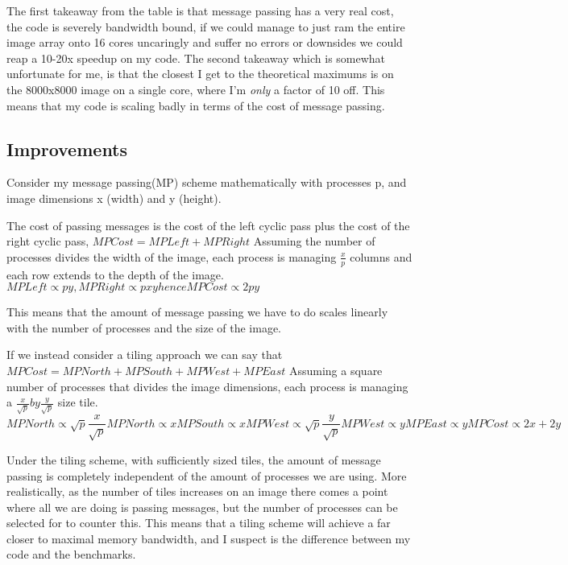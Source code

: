 \documentclass[10pt]{article}
\begin{document}
    The first takeaway from the table is that message passing has a very real cost, the code is severely bandwidth bound,
    if we could manage to just ram the entire image array onto 16 cores uncaringly and suffer no errors or downsides we could reap a 10-20x speedup on my code.
    The second takeaway which is somewhat unfortunate for me, is that the closest I get to the theoretical maximums is on the 8000x8000 image on a single core, where
    I'm \textit{only} a factor of 10 off. This means that my code is scaling badly in terms of the cost of message passing.

    \subsection{Improvements}
    Consider my message passing(MP) scheme mathematically with processes p, and image dimensions x (width) and y (height).

    The cost of passing messages is the cost of the left cyclic pass plus the cost of the right cyclic pass, $MP Cost = MP Left + MP Right$
    Assuming the number of processes divides the width of the image, each process is managing $\frac{x}{p}$ columns and each row extends to
    the depth of the image.
    $MP Left \propto py , MP Right \propto pxy hence MP Cost \propto 2py$

    This means that the amount of message passing we have to do scales linearly with the number of processes and the size of the image.

    If we instead consider a tiling approach we can say that $MP Cost = MP North + MP South + MP West + MP East$
    Assuming a square number of processes that divides the image dimensions, each process is managing a $\frac{x}{\sqrt{p}} by \frac{y}{\sqrt{p}}$ size tile.
    $$ MP North \propto \sqrt{p}\frac{x}{\sqrt{p}}
    MP North \propto x
    MP South \propto x
    MP West \propto \sqrt{p}\frac{y}{\sqrt{p}}
    MP West \propto y
    MP East \propto y

    MP Cost \propto 2x+2y$$

    Under the tiling scheme, with sufficiently sized tiles, the amount of message passing is completely independent of the amount of processes we are using.
    More realistically, as the number of tiles increases on an image there comes a point where all we are doing is passing messages, but the number of processes
    can be selected for to counter this.
    This means that a tiling scheme will achieve a far closer to maximal memory bandwidth, and I suspect is the difference between my code and the benchmarks.
\end{document}
